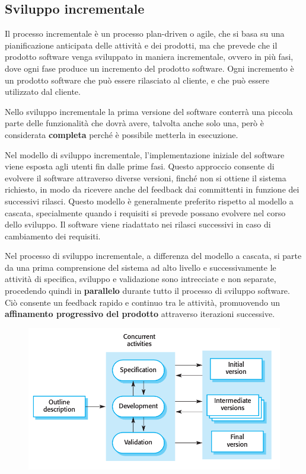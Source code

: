 \subsection{Sviluppo incrementale}
Il processo incrementale è un processo plan-driven o agile, che si basa su una pianificazione
anticipata delle attività e dei prodotti, ma che prevede che il prodotto software
venga sviluppato in maniera incrementale, ovvero in più fasi, dove ogni fase
produce un incremento del prodotto software. Ogni incremento è un prodotto software
che può essere rilasciato al cliente, e che può essere utilizzato dal cliente. 

Nello sviluppo incrementale la prima versione del software conterrà una piccola parte 
delle funzionalità che dovrà avere, talvolta anche solo una, però è considerata \textbf{completa} 
perché è possibile metterla in esecuzione.

Nel modello di sviluppo incrementale, l'implementazione iniziale del software viene esposta
agli utenti fin dalle prime fasi. Questo approccio consente di evolvere il software
attraverso diverse versioni, finché non si ottiene il sistema richiesto, in modo 
da ricevere anche del feedback dai committenti in funzione dei successivi rilasci.
Questo modello è generalmente preferito rispetto al modello a cascata,
specialmente quando i requisiti si prevede possano evolvere nel corso dello sviluppo.
Il software viene riadattato nei rilasci successivi in caso di cambiamento dei 
requisiti.

Nel processo di sviluppo incrementale, a differenza del modello a cascata, si parte da una 
prima comprensione del sistema ad alto livello e successivamente le attività di specifica, sviluppo e validazione
sono intrecciate e non separate, procedendo quindi in \textbf{parallelo} durante tutto 
il processo di sviluppo software. Ciò consente un feedback rapido e continuo tra le
attività, promuovendo un \textbf{affinamento progressivo del prodotto} attraverso iterazioni
successive.
\begin{figure}[H]
    \centering
    \includegraphics[scale=0.3]{img/incrementale.png}
\end{figure}
